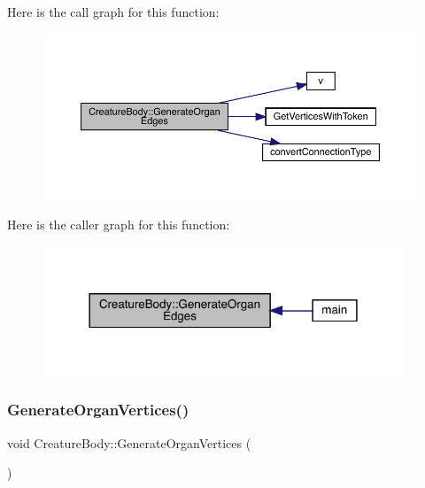 Here is the call graph for this function\+:
\nopagebreak
\begin{figure}[H]
\begin{center}
\leavevmode
\includegraphics[width=350pt]{class_creature_body_af1303a40606bf06aed980f14e7027d54_cgraph}
\end{center}
\end{figure}
Here is the caller graph for this function\+:
\nopagebreak
\begin{figure}[H]
\begin{center}
\leavevmode
\includegraphics[width=306pt]{class_creature_body_af1303a40606bf06aed980f14e7027d54_icgraph}
\end{center}
\end{figure}
\mbox{\label{class_creature_body_a9cf5cffe6209ed851bf32c2b164d9391}} 
\subsubsection{\texorpdfstring{Generate\+Organ\+Vertices()}{GenerateOrganVertices()}}
{\footnotesize\ttfamily void Creature\+Body\+::\+Generate\+Organ\+Vertices (\begin{DoxyParamCaption}{ }\end{DoxyParamCaption})}

